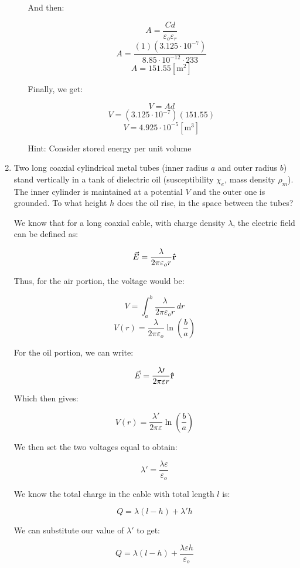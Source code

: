 \begin{enumerate}
\begin{enumerate}
        And then:

        $$A=\frac{Cd}{\varepsilon_o\varepsilon_r}$$
        $$A=\frac{(1)(3.125\cdot10^{-7})}{8.85\cdot10^{-12}\cdot233}$$
        $$A=151.55[\si{\meter\squared}]$$

        Finally, we get:

        $$V=Ad$$
        $$V=\left( 3.125\cdot10^{-7} \right)\left( 151.55 \right)$$
        $$\boxed{V=4.925\cdot10^{-5}[\si{\meter\cubed}]}$$

      Hint: Consider stored energy per unit volume

    \end{enumerate}

  \item Two long coaxial cylindrical metal tubes (inner radius $a$ and outer radius $b$) stand vertically in a tank of dielectric oil (susceptibility $\chi_e$, mass density $\rho_m$).  The inner cylinder is maintained at a potential $V$ and the outer one is grounded. To what height $h$ does the oil rise, in the space between the tubes?

    We know that for a long coaxial cable, with charge density $\lambda$, the electric field can be defined as:

    $$\vec{E}=\frac{\lambda}{2\pi\varepsilon_o r}\bold{\hat{r}}$$

    Thus, for the air portion, the voltage would be:

    $$V=\int_a^b \frac{\lambda}{2\pi\varepsilon_o r}\,dr$$
    $$V(r)=\frac{\lambda}{2\pi\varepsilon_o}\ln\left( \frac{b}{a} \right)$$

    For the oil portion, we can write:

    $$\vec{E}=\frac{\lambda\prime}{2\pi\varepsilon r}\bold{\hat{r}}$$

    Which then gives:

    $$V(r)=\frac{\lambda\prime}{2\pi\varepsilon}\ln\left( \frac{b}{a} \right)$$

    We then set the two voltages equal to obtain:

    $$\lambda\prime=\frac{\lambda\varepsilon}{\varepsilon_o}$$

    We know the total charge in the cable with total length $l$ is:

    $$Q=\lambda(l-h)+\lambda\prime h$$

    We can substitute our value of $\lambda\prime$ to get:

    $$Q=\lambda(l-h)+\frac{\lambda\varepsilon h}{\varepsilon_o}$$


\end{enumerate}

